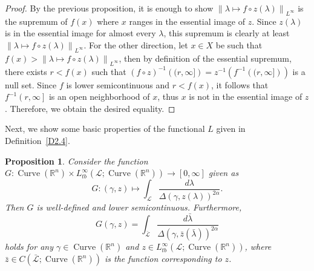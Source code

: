 \documentclass[reqno,centertags,12pt]{amsart}
\newtheorem{proposition}[theorem]{Proposition}
\theoremstyle{definition}
\numberwithin{equation}{section}
\newcommand{\norm}[1]{\left\|#1\right\|}
\newcommand{\bbR}{{\mathbb{R}}}
\begin{document}
\begin{proof}
    By the previous proposition, it is enough to show
    $\norm{\lambda\mapsto f\circ z(\lambda)}_{L^{\infty}}$ is the supremum
    of $f(x)$ where $x$ ranges in the essential image of $z$.
    Since $z(\lambda)$ is in the essential image for almost every $\lambda$,
    this supremum is clearly at least $\norm{\lambda\mapsto f\circ z(\lambda)}_{L^{\infty}}$.
    For the other direction, let $x\in X$ be such that
    $f(x) > \norm{\lambda\mapsto f\circ z(\lambda)}_{L^{\infty}}$, then by
    definition of the essential supremum, there exists $r<f(x)$ such that
    $(f\circ z)^{-1}\left((r,\infty]\right)
    = z^{-1}\left(f^{-1}\left((r,\infty]\right)\right)$ is a null set.
    Since $f$ is lower semicontinuous and $r<f(x)$,
    it follows that $f^{-1}\left(r,\infty\right]$
    is an open neighborhood of $x$, thus $x$ is not in the essential image of $z$.
    Therefore, we obtain the desired equality.
\end{proof}


Next, we show some basic properties of the functional $L$ given in
Definition~\ref{D2.4}.

\begin{proposition}\label{PC.7}
    Consider the function $G\colon\operatorname{Curve}(\bbR^{n})
    \times L_{tb}^{\infty}(\mathcal{L};\operatorname{Curve}(\bbR^{n}))\to[0,\infty]$ given as
    \[
        G\colon (\gamma,z)\mapsto \int_{\mathcal{L}}
        \frac{d\lambda}{\Delta(\gamma,z(\lambda))^{2\alpha}}.
    \]
    Then $G$ is well-defined and lower semicontinuous. Furthermore,
    \[
        G(\gamma,z) = \int_{\bar{\mathcal{L}}}
        \frac{d\bar{\lambda}}{\Delta(\gamma,\bar{z}(\bar{\lambda}))^{2\alpha}}
    \]
    holds for any $\gamma\in\operatorname{Curve}(\bbR^{n})$
    and $z\in L_{tb}^{\infty}(\mathcal{L};\operatorname{Curve}(\bbR^{n}))$,
    where $\bar{z}\in C(\bar{\mathcal{L}};\operatorname{Curve}(\bbR^{n}))$
    is the function corresponding to $z$.
\end{proposition}
\end{document}
